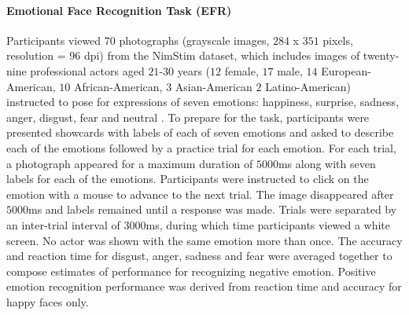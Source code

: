 \documentclass{article}%
\begin{document}
\paragraph*{Emotional Face Recognition Task (EFR)} Participants viewed $70$ photographs (grayscale images, $284$ x $351$ pixels, resolution = $96$ dpi) from the NimStim dataset, which includes images of twenty-nine professional actors aged $21$-$30$ years ($12$ female, $17$ male, $14$ European-American, $10$ African-American, $3$ Asian-American $2$ Latino-American) instructed to pose for expressions of seven emotions: happiness, surprise, sadness, anger, disgust, fear and neutral \citep{tottenham2009nimstim}. To prepare for the task, participants were presented showcards with labels of each of seven emotions and asked to describe each of the emotions followed by a practice trial for each emotion. For each trial, a photograph appeared for a maximum duration of $5000$ms along with seven labels for each of the emotions. Participants were instructed to click on the emotion with a mouse to advance to the next trial. The image disappeared after $5000$ms and labels remained until a response was made. Trials were separated by an inter-trial interval of $3000$ms, during which time participants viewed a white screen. No actor was shown with the same emotion more than once. The accuracy and reaction time for disgust, anger, sadness and fear were averaged together to compose estimates of performance for recognizing negative emotion. Positive emotion recognition performance was derived from reaction time and accuracy for happy faces only. 
\end{document}
